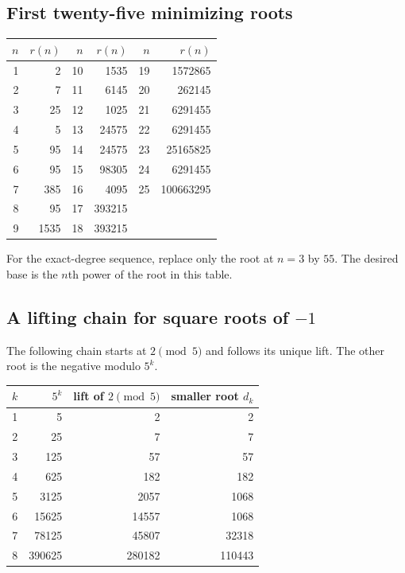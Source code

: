 \documentclass[11pt,a4paper]{article}
\theoremstyle{definition}
\begin{document}
\subsection{First twenty-five minimizing roots}
\begin{center}
\begin{tabular}{rr@{\qquad\qquad}rr@{\qquad\qquad}rr}
\toprule
$n$&$r(n)$&$n$&$r(n)$&$n$&$r(n)$\\
\midrule
1&2&10&1535&19&1572865\\
2&7&11&6145&20&262145\\
3&25&12&1025&21&6291455\\
4&5&13&24575&22&6291455\\
5&95&14&24575&23&25165825\\
6&95&15&98305&24&6291455\\
7&385&16&4095&25&100663295\\
8&95&17&393215&&\\
9&1535&18&393215&&\\
\bottomrule
\end{tabular}
\end{center}
For the exact-degree sequence, replace only the root at $n=3$ by $55$.
The desired base is the $n$th power of the root in this table.

\subsection{A lifting chain for square roots of \texorpdfstring{$-1$}{-1}}
The following chain starts at $2\pmod5$ and follows its unique lift.
The other root is the negative modulo $5^k$.
\begin{center}
\begin{tabular}{rrrr}
\toprule
$k$&$5^k$&lift of $2\pmod5$&smaller root $d_k$\\
\midrule
1&5&2&2\\
2&25&7&7\\
3&125&57&57\\
4&625&182&182\\
5&3125&2057&1068\\
6&15625&14557&1068\\
7&78125&45807&32318\\
8&390625&280182&110443\\
\bottomrule
\end{tabular}
\end{center}
\end{document}

